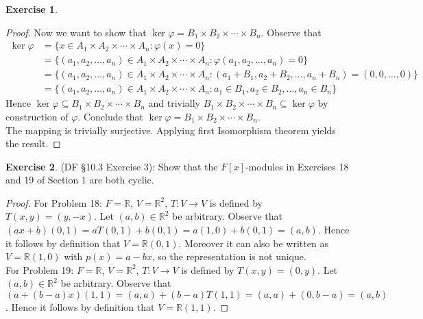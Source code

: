 \documentclass[8pt]{amsart}
\theoremstyle{plain}%
\theoremstyle{definition}
\newtheorem*{exercise}{Exercise}%
\theoremstyle{remark}
\numberwithin{equation}{section}
\newcommand{\R}{\mathbb{R}}
\begin{document}
\begin{exercise}
\begin{proof}
		Now we want to show that $\ker \varphi = B_1 \times B_2 \times \cdots \times B_n$. Observe that
		\begin{align*}
			\ker \varphi &= \{x \in A_1 \times A_2 \times \cdots \times A_n : \varphi(x)= 0\}\\
			&= \{(a_1, a_2, \ldots, a_n) \in A_1 \times A_2 \times \cdots \times A_n : \varphi(a_1, a_2, \ldots, a_n) = 0\}\\
			&= \{(a_1, a_2, \ldots, a_n) \in A_1 \times A_2 \times \cdots \times A_n : (a_1 + B_1, a_2 + B_2, \ldots, a_n + B_n) = (0, 0, \ldots, 0)\}\\
			&= \{(a_1, a_2, \ldots, a_n) \in A_1 \times A_2 \times \cdots \times A_n : a_1 \in B_1, a_2 \in B_2, \ldots, a_n \in B_n\}
		\end{align*}
		Hence $\ker\varphi \subseteq B_1 \times B_2 \times \cdots \times B_n$ and trivially $B_1 \times B_2 \times \cdots \times B_n \subseteq \ker \varphi$ by construction of $\varphi$. Conclude that $\ker \varphi = B_1 \times B_2 \times \cdots \times B_n$.\\

		The mapping is trivially surjective. Applying first Isomorphism theorem yields the result.
	\end{proof}
\end{exercise}

\begin{exercise}
(DF \S 10.3 Exercise 3): Show that the $F[x]$-modules in Exercises 18 and 19 of Section 1 are both cyclic.
	\begin{proof}
		For Problem 18: $F = \R$, $V = \R^2$, $T : V \to V$ is defined by $T(x, y) = (y, -x)$. Let $(a, b) \in \R^2$ be arbitrary. Observe that $(ax + b)(0, 1) = aT(0, 1) + b(0, 1) = a(1, 0) + b(0, 1) = (a, b)$. Hence it follows by definition that $V = \R(0, 1)$. Moreover it can also be written as $V = \R(1, 0)$ with $p(x) = a - bx$, so the representation is not unique.\\

		For Problem 19: $F = \R$, $V = \R^2$, $T : V \to V$ is defined by $T(x, y) = (0, y)$. Let $(a, b) \in \R^2$ be arbitrary. Observe that $(a + (b - a)x)(1, 1) = (a, a) + (b - a)T(1, 1) = (a, a) + (0, b - a) = (a, b)$. Hence it follows by definition that $V = \R(1, 1)$.
	\end{proof}
\end{exercise}
\end{document}
